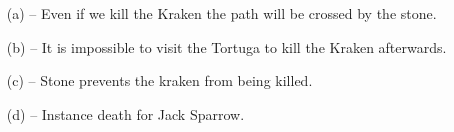 \documentclass[a4paper]{article}
\begin{document}
\begin{figure}[H]
    \centering
    \hfill %
    \hfill
    \hfill
    \hfill
\end{figure}
\begin{enumerate}
    \item [(a)] -- Even if we kill the Kraken the path will be crossed by the stone.
    \item [(b)] -- It is impossible to visit the Tortuga to kill the Kraken afterwards.
    \item [(c)] -- Stone prevents the kraken from being killed.
    \item [(d)] -- Instance death for Jack Sparrow.
\end{enumerate}
\end{document}
